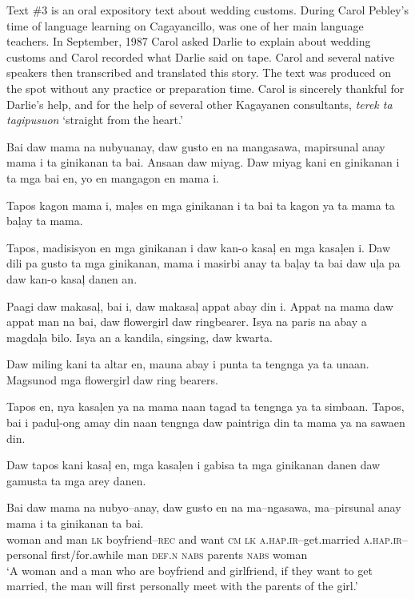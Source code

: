 Text \#3 is an oral expository text about wedding customs. During Carol Pebley’s time of language learning on Cagayancillo,  was one of her main language teachers. In September, 1987 Carol asked Darlie to explain about wedding customs and Carol recorded what Darlie said on tape. Carol and several native speakers then transcribed and translated this story. The text was produced on the spot without any practice or preparation time. Carol is sincerely thankful for Darlie’s help, and for the help of several other Kagayanen consultants, \textit{terek ta tagipusuon} ‘straight from the heart.’

\vspace{12pt}

Bai daw mama na nubyuanay, daw gusto en na mangasawa, mapirsunal anay mama i ta ginikanan ta bai. Ansaan daw miyag. Daw miyag kani en ginikanan i ta mga bai en, yo en mangagon en mama i.

Tapos kagon mama i, ma\c{l}es en mga ginikanan i ta bai ta kagon ya ta mama ta ba\c{l}ay ta mama. 

Tapos, madisisyon en mga ginikanan i daw kan-o kasa\c{l} en mga kasa\c{l}en i. Daw dili pa gusto ta mga ginikanan, mama i masirbi anay ta ba\c{l}ay ta bai daw u\c{l}a pa daw kan-o kasa\c{l} danen an.

Paagi daw makasa\c{l}, bai i, daw makasa\c{l} appat abay din i. Appat na mama daw appat man na bai, daw flowergirl daw ringbearer. Isya na paris na abay a magda\c{l}a bilo. Isya an a kandila, singsing, daw kwarta. 

Daw miling kani ta altar en, mauna abay i punta ta tengnga ya ta unaan. Magsunod mga flowergirl daw ring bearers.

Tapos en, nya kasa\c{l}en ya na mama naan tagad ta tengnga ya ta simbaan. Tapos, bai i padu\c{l}{}-ong amay din naan tengnga daw paintriga din ta mama ya na sawaen din.

Daw tapos kani kasa\c{l} en, mga kasa\c{l}en i gabisa ta mga ginikanan danen daw gamusta ta mga arey danen. 

\ea
\gll Bai  daw  mama  na  nubyo--anay,  daw  gusto  en  na  ma--ngasawa, ma--pirsunal  anay  mama  i  ta  ginikanan  ta  bai.\\
woman  and  man  \textsc{lk}  boyfriend--\textsc{rec}  and  want  \textsc{cm}  \textsc{lk}  \textsc{a.hap.ir}--get.married
\textsc{a.hap.ir}--personal  first/for.awhile  man  \textsc{def.n}  \textsc{nabs}  parents  \textsc{nabs}  woman \\
\glt ‘A woman and a man who are boyfriend and girlfriend, if they want to get married, the man will first personally meet with the parents of the girl.’
\z

